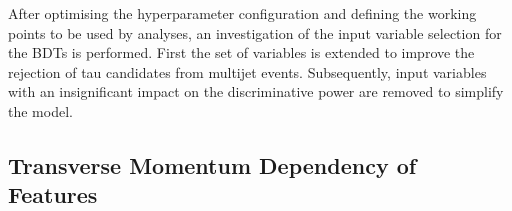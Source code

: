 After optimising the hyperparameter configuration and defining the working
points to be used by analyses, an investigation of the input variable selection
for the BDTs is performed. First the set of variables is extended to improve the
rejection of tau candidates from multijet events. Subsequently, input variables
with an insignificant impact on the discriminative power are removed to simplify
the model.

\subsection{Transverse Momentum Dependency of Features}
\label{sec:bdt_incl_pt}


